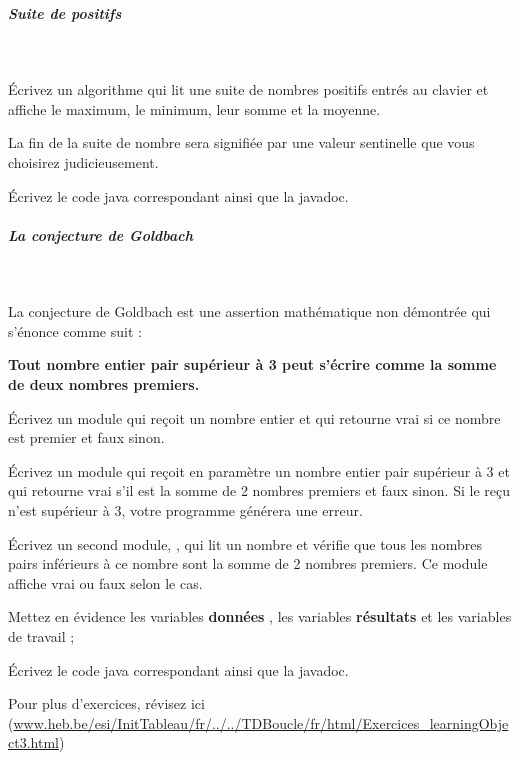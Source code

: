 \documentclass[11pt,a4paper]{article}
\begin{document}
			
		\subparagraph{Suite de positifs} 
		
					\textcolor{white}{.} \par
				
          \'Ecrivez un algorithme qui lit une suite de nombres positifs entr\'es au clavier et affiche
          le maximum, le minimum, leur somme et la moyenne.\par
				
          La fin de la suite de nombre sera signifi\'ee par une valeur sentinelle que vous choisirez
          judicieusement.
        
            \par
        \'Ecrivez le code java correspondant ainsi que la javadoc.
            \par
        
			
		\subparagraph{La conjecture de Goldbach} 
		
					\textcolor{white}{.} \par
				
          La conjecture de Goldbach est une assertion math\'ematique non d\'emontr\'ee qui s'\'enonce comme suit :
        
            \par
        \textbf{Tout nombre entier pair sup\'erieur \`a 3 peut s'\'ecrire comme la somme de deux nombres premiers.}
            \par
        
          \'Ecrivez un module \verb@isPremier@ qui re\c coit un nombre entier \verb@n@ 
          et qui retourne vrai si ce nombre est premier et faux sinon.
        
            \par
        
          \'Ecrivez un module \verb@goldbach@ qui re\c coit en param\`etre 
          un nombre entier pair \verb@p@ sup\'erieur \`a 3 
          et qui retourne vrai s'il est la somme de 2 nombres premiers et faux sinon.
          Si le \verb@p@ re\c cu n'est sup\'erieur \`a 3, votre programme g\'en\'erera une erreur.
        
            \par
        
          \'Ecrivez un second module, \verb@principal@, qui lit un nombre et v\'erifie que tous les
          nombres pairs inf\'erieurs \`a ce nombre sont la somme de 2 nombres premiers. Ce module affiche vrai ou faux selon le cas.
        
            \par
        
          Mettez en \'evidence les variables \textbf{\guillemotleft  donn\'ees \guillemotright }, 
          les variables \textbf{\guillemotleft  r\'esultats \guillemotright } et les variables de travail ;
        
            \par
        \'Ecrivez le code java correspondant ainsi que la javadoc.
            \par
        Pour plus d'exercices, 
        r\'evisez ici (\url{www.heb.be/esi/InitTableau/fr/../../TDBoucle/fr/html/Exercices\_learningObject3.html})
            \par
        
				
\end{document}
